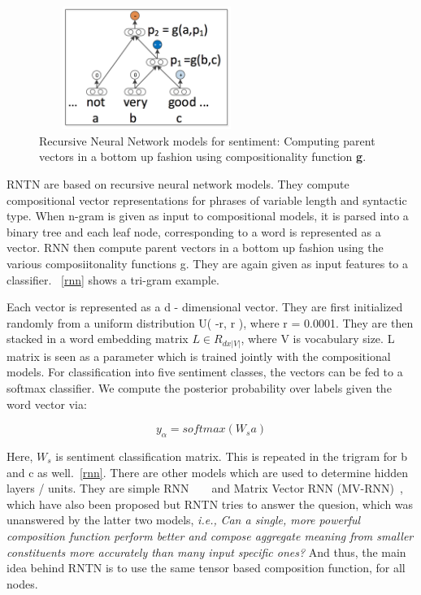 \begin{figure}[ht!]
	\centering
		\includegraphics[height=40mm,  width=70mm]{figures/5_rnn.png}
		\caption[Recursive Neural Network Approach]{Recursive Neural Network models for sentiment: Computing parent vectors in a bottom up fashion using compositionality function \textbf{g}.}
			\label{rnn}
\end{figure}

RNTN are based on recursive neural network models.  They compute compositional vector representations for phrases of variable length and syntactic type. When n-gram is given as input to compositional models, it is parsed into a binary tree and each leaf node, corresponding to a word is represented as a vector. RNN then compute parent vectors in a bottom up fashion using the various composiitonality functions g. They are again given as input features to a classifier. ~\autoref{rnn} shows a tri-gram example.

Each vector is represented as a d - dimensional vector. They are first initialized randomly from a uniform distribution U( -r, r ), where r = 0.0001. They are then stacked in a word embedding matrix $L \in {R}_{d x |V|}$, where V is vocabulary size. L matrix is seen as a parameter which is trained jointly with the compositional models. For classification into five sentiment classes, the vectors can be fed to a softmax classifier. We compute the posterior probability over labels given the word vector via:

\begin{equation}
{y}_{\alpha} = softmax({W}_{s}a)
\end{equation}

Here, ${W}_{s}$ is sentiment classification matrix. This is repeated in the trigram for b and c as well.~\autoref{rnn}. There are other  models which are used to determine hidden layers / units. They are simple RNN ~\parencite{gollkuch} ~\parencite{socherrnn} and Matrix Vector RNN (MV-RNN)~\parencite{mvrnn}, which have also been proposed but RNTN tries to answer the quesion, which was unanswered by the latter two models, \textit{i.e.,} \textit{Can a single, more powerful composition function perform better and compose aggregate meaning from smaller constituents more accurately than many input specific ones?} And thus, the main idea behind RNTN is to use the same tensor based composition function, for all nodes. 


